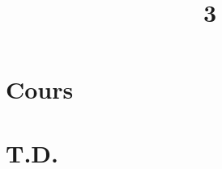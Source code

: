 \documentclass[a4paper]{article}
\title{3}{Intégrer sur un intervalle}
\begin{document}
	\part{Cours}
	
	
	
	
	\clearpage\null\clearpage
	
	\clearpage\null\clearpage
	\renewcommand{\thesection}{}
	\renewcommand{\thesubsection}{}
	\part{T.D.}
	
	
	
	
\end{document}
